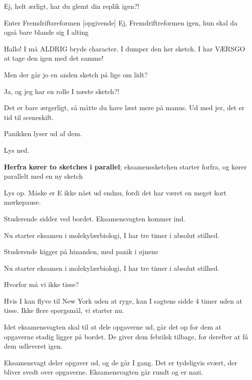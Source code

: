 \documentclass[a4paper,11pt]{article}
\begin{document}
\begin{sketch}

 Ej, helt ærligt, har du glemt din replik igen?!

\scene Enter Fremdriftsreformen
[opgivende] Ej, Fremdriftreformen igen, hun skal da også bare blande sig I alting

 Hallo! I må ALDRIG bryde character. I dumper den her sketch. I har VÆRSGO at tage den igen med det samme!

 Men der går jo en anden sketch på lige om lidt?

 Ja, og jeg har en rolle I næste sketch?!

 Det er bare ærgerligt, så måtte du have læst mere på manus. Ud med jer, det er tid til sceneskift.

\scene Panikken lyser ud af dem.

\scene Lys ned.

\scene \textbf{Herfra kører to sketches i parallel}; eksamenssketchen starter forfra, og kører parallelt med en ny sketch

\scene Lys op. Måske er E ikke nået ud endnu, fordi det har været en meget kort mørkepause.

Studerende sidder ved bordet. Eksamensvagten kommer ind.


 Nu starter eksamen i molekylærbiologi, I har tre timer i absolut stilhed.

\scene Studerende kigger på hinanden, med panik i øjnene


 Nu starter eksamen i molekylærbiologi, I har tre timer i absolut stilhed.

 Hvorfor må vi ikke tisse?

 Hvis I kan flyve til New York uden at ryge, kan I sagtens sidde 4 timer uden at tisse. Ikke flere spørgsmål, vi starter nu.


\scene Idet eksamensvagten skal til at dele opgaverne ud, går det op for dem at opgaverne stadig ligger på bordet. De giver dem febrilsk tilbage, for derefter at få dem udleveret igen.

\scene Eksamensvagt deler opgaver ud, og de går I gang. Det er tydeligvis svært, der bliver svedt over opgaverne. Eksamensvagten går rundt og er nazi.


\end{sketch}
\end{document}
